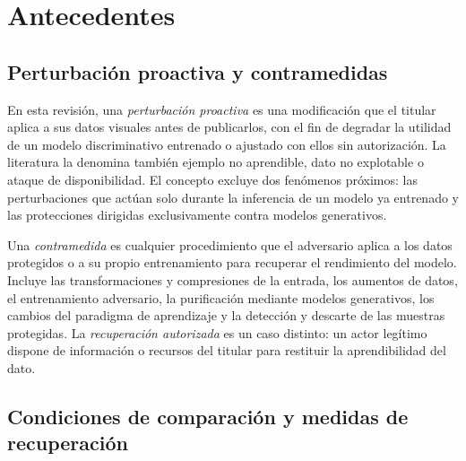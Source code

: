 \section{Antecedentes}\label{sec:antecedentes}

\subsection{Perturbación proactiva y contramedidas}

En esta revisión, una \emph{perturbación proactiva} es una modificación que el titular aplica a sus datos visuales antes de publicarlos, con el fin de degradar la utilidad de un modelo discriminativo entrenado o ajustado con ellos sin autorización. La literatura la denomina también ejemplo no aprendible, dato no explotable o ataque de disponibilidad. El concepto excluye dos fenómenos próximos: las perturbaciones que actúan solo durante la inferencia de un modelo ya entrenado y las protecciones dirigidas exclusivamente contra modelos generativos.

Una \emph{contramedida} es cualquier procedimiento que el adversario aplica a los datos protegidos o a su propio entrenamiento para recuperar el rendimiento del modelo. Incluye las transformaciones y compresiones de la entrada, los aumentos de datos, el entrenamiento adversario, la purificación mediante modelos generativos, los cambios del paradigma de aprendizaje y la detección y descarte de las muestras protegidas. La \emph{recuperación autorizada} es un caso distinto: un actor legítimo dispone de información o recursos del titular para restituir la aprendibilidad del dato.

\subsection{Condiciones de comparación y medidas de recuperación}\label{sec:condiciones}

